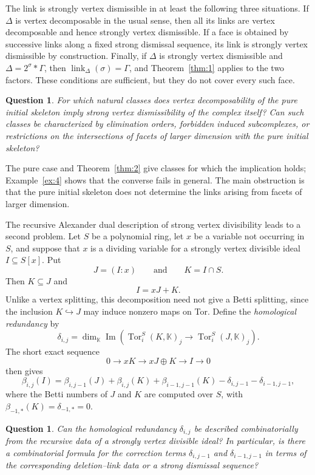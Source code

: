 \documentclass[11pt]{amsart}
\newcommand{\K}{\mathbb K}
\DeclareMathOperator{\link}{link}
\newtheorem{question}[theorem]{Question}
\theoremstyle{definition}
\begin{document}
	The link is strongly vertex dismissible in at least the following three situations. If $\Delta$ is vertex decomposable in the usual sense, then all its links are vertex decomposable and hence strongly vertex dismissible. If a face is obtained by successive links along a fixed strong dismissal sequence, its link is strongly vertex dismissible by construction. Finally, if $\Delta$ is strongly vertex dismissible and $\Delta=2^\sigma*\Gamma$, then $\link_\Delta(\sigma)=\Gamma$, and Theorem~\ref{thm:1} applies to the two factors. These conditions are sufficient, but they do not cover every such face.
	
	\begin{question}\label{q:1}
		For which natural classes does vertex decomposability of the pure initial skeleton imply strong vertex dismissibility of the complex itself? Can such classes be characterized by elimination orders, forbidden induced subcomplexes, or restrictions on the intersections of facets of larger dimension with the pure initial skeleton?
	\end{question}
	
	The pure case and Theorem~\ref{thm:2} give classes for which the implication holds; Example~\ref{ex:4} shows that the converse fails in general. The main obstruction is that the pure initial skeleton does not determine the links arising from facets of larger dimension.
	
	The recursive Alexander dual description of strong vertex divisibility leads to a second problem. Let $S$ be a polynomial ring, let $x$ be a variable not occurring in $S$, and suppose that $x$ is a dividing variable for a strongly vertex divisible ideal $I\subseteq S[x]$. Put
	\[
	J=(I:x)
	\qquad\text{and}\qquad
	K=I\cap S.
	\]
	Then $K\subseteq J$ and
	\[
	I=xJ+K.
	\]
	Unlike a vertex splitting, this decomposition need not give a Betti splitting, since the inclusion $K\hookrightarrow J$ may induce nonzero maps on Tor. Define the \emph{homological redundancy} by
	\[
	\delta_{i,j}
	=
	\dim_{\K}\operatorname{Im}\!\left(
	\operatorname{Tor}_i^S(K,\K)_j
	\longrightarrow
	\operatorname{Tor}_i^S(J,\K)_j
	\right).
	\]
	The short exact sequence
	\[
	0\longrightarrow xK
	\longrightarrow xJ\oplus K
	\longrightarrow I
	\longrightarrow0
	\]
	then gives
	\[
	\beta_{i,j}(I)
	=
	\beta_{i,j-1}(J)
	+\beta_{i,j}(K)
	+\beta_{i-1,j-1}(K)
	-\delta_{i,j-1}
	-\delta_{i-1,j-1},
	\]
	where the Betti numbers of $J$ and $K$ are computed over $S$, with $\beta_{-1,*}(K)=\delta_{-1,*}=0$.
	
	\begin{question}\label{q:homological-redundancy}
		Can the homological redundancy $\delta_{i,j}$ be described combinatorially from the recursive data of a strongly vertex divisible ideal? In particular, is there a combinatorial formula for the correction terms $\delta_{i,j-1}$ and $\delta_{i-1,j-1}$ in terms of the corresponding deletion--link data or a strong dismissal sequence?
	\end{question}
	
\end{document}
